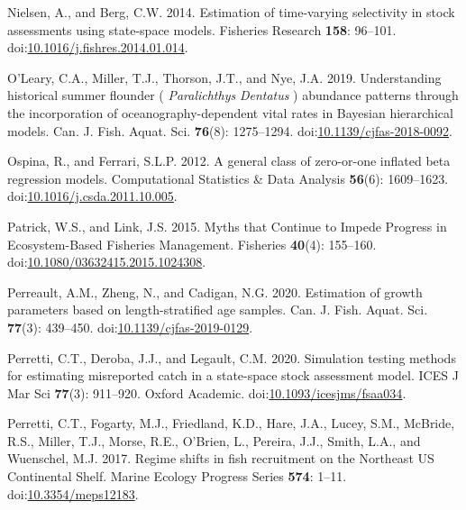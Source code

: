 \documentclass[]{article}
\begin{document}
\leavevmode\hypertarget{ref-nielsen2014Estimation}{}%
Nielsen, A., and Berg, C.W. 2014. Estimation of time-varying selectivity
in stock assessments using state-space models. Fisheries Research
\textbf{158}: 96--101.
doi:\href{https://doi.org/10.1016/j.fishres.2014.01.014}{10.1016/j.fishres.2014.01.014}.

\leavevmode\hypertarget{ref-oleary2019Understanding}{}%
O'Leary, C.A., Miller, T.J., Thorson, J.T., and Nye, J.A. 2019.
Understanding historical summer flounder ( \emph{Paralichthys}
\emph{Dentatus} ) abundance patterns through the incorporation of
oceanography-dependent vital rates in Bayesian hierarchical models. Can.
J. Fish. Aquat. Sci. \textbf{76}(8): 1275--1294.
doi:\href{https://doi.org/10.1139/cjfas-2018-0092}{10.1139/cjfas-2018-0092}.

\leavevmode\hypertarget{ref-ospina2012General}{}%
Ospina, R., and Ferrari, S.L.P. 2012. A general class of zero-or-one
inflated beta regression models. Computational Statistics \& Data
Analysis \textbf{56}(6): 1609--1623.
doi:\href{https://doi.org/10.1016/j.csda.2011.10.005}{10.1016/j.csda.2011.10.005}.

\leavevmode\hypertarget{ref-patrick2015Myths}{}%
Patrick, W.S., and Link, J.S. 2015. Myths that Continue to Impede
Progress in Ecosystem-Based Fisheries Management. Fisheries
\textbf{40}(4): 155--160.
doi:\href{https://doi.org/10.1080/03632415.2015.1024308}{10.1080/03632415.2015.1024308}.

\leavevmode\hypertarget{ref-perreault2020Estimation}{}%
Perreault, A.M., Zheng, N., and Cadigan, N.G. 2020. Estimation of growth
parameters based on length-stratified age samples. Can. J. Fish. Aquat.
Sci. \textbf{77}(3): 439--450.
doi:\href{https://doi.org/10.1139/cjfas-2019-0129}{10.1139/cjfas-2019-0129}.

\leavevmode\hypertarget{ref-perretti2020Simulation}{}%
Perretti, C.T., Deroba, J.J., and Legault, C.M. 2020. Simulation testing
methods for estimating misreported catch in a state-space stock
assessment model. ICES J Mar Sci \textbf{77}(3): 911--920. Oxford
Academic.
doi:\href{https://doi.org/10.1093/icesjms/fsaa034}{10.1093/icesjms/fsaa034}.

\leavevmode\hypertarget{ref-perretti2017Regime}{}%
Perretti, C.T., Fogarty, M.J., Friedland, K.D., Hare, J.A., Lucey, S.M.,
McBride, R.S., Miller, T.J., Morse, R.E., O'Brien, L., Pereira, J.J.,
Smith, L.A., and Wuenschel, M.J. 2017. Regime shifts in fish recruitment
on the Northeast US Continental Shelf. Marine Ecology Progress Series
\textbf{574}: 1--11.
doi:\href{https://doi.org/10.3354/meps12183}{10.3354/meps12183}.
\end{document}
